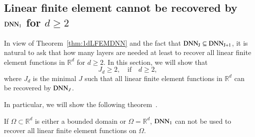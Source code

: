 \subsection{Linear finite element cannot be recovered by ${\rm DNN}_1$ for $d\ge2$}
In view of  Theorem~\ref{thm:1dLFEMDNN} and the fact that ${\rm{DNN}_J}
\subseteq {\rm{DNN}_{J+1}} $, it is natural to ask that how many
layers are needed at least to recover all linear finite element
functions in $\mathbb{R}^d$ for $d\ge2$.  In this section, we will show that 
\begin{equation}\label{key}
J_d \ge 2, \quad \text{if} \quad d\ge 2,
\end{equation}
where $J_d$ is the minimal $J$ such that all linear finite element
functions in $\mathbb R^d$ can be recovered by ${\rm DNN}_J$.

In particular, we will show the following theorem~\cite{he2020relu}.
\begin{theorem}\label{lowerbound}
	If $\Omega\subset \mathbb R^d$ is either 
	a bounded domain or $\Omega=\mathbb{R}^d$,  
	${\rm DNN}_1$ can not be used to recover all linear finite element
	functions on $\Omega$. 
\end{theorem}
